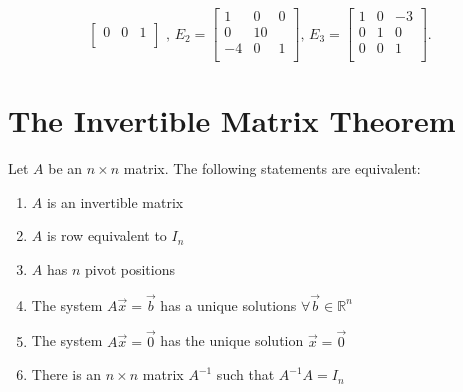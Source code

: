 \documentclass{report}
\begin{document}
{\begin{enumerate} [label=(\alph*)]
\[\begin{bmatrix}
          0 & 0 & 1\\
          \end{bmatrix} \text{ , } E_2= \begin{bmatrix}
          1 & 0 & 0\\
          0 &1  0& \\
          -4 & 0 & 1\\
          \end{bmatrix} \text{, } E_3 = \begin{bmatrix}
          1 & 0 & -3\\
          0 & 1 & 0\\
          0 &0  &1 \\
          \end{bmatrix}
          .\] 
  \end{enumerate}
  
}

\section{The Invertible Matrix Theorem}
Let $A $ be an $n \times n$ matrix. The following statements are equivalent:
\begin{enumerate} [label=(\alph*)]
  \item $A$ is an invertible matrix
  \item $A$ is row equivalent to $I_n$
  \item $A$ has $n$ pivot positions
  \item The system $A \vec{x} = \vec{b} $ has a unique solutions $\forall \vec{b} \in \mathbb{R}^{n}$
  \item The system $A \vec{x} = \vec{0} $ has the unique solution $\vec{x} =\vec{0} $ 
  \item There is an $n \times n$ matrix $A^{-1}$ such that $A^{-1}A =I_n$
  \end{enumerate}
\end{document}
